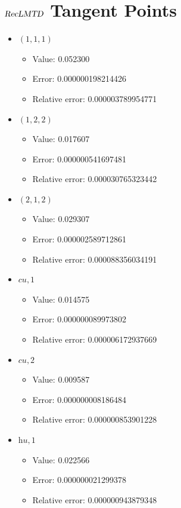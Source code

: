 \documentclass{article}%
\begin{document}
\section{$\textsl{RecLMTD}$ Tangent Points}%
\thispagestyle{plain}%
\begin{itemize}%
	\item $(1, 1, 1)$%
	\begin{itemize}%
		\item Value: 0.052300%
		\item Error: 0.000000198214426%
		\item Relative error: 0.000003789954771%
	\end{itemize}%
	\item $(1, 2, 2)$%
	\begin{itemize}%
		\item Value: 0.017607%
		\item Error: 0.000000541697481%
		\item Relative error: 0.000030765323442%
	\end{itemize}%
	\item $(2, 1, 2)$%
	\begin{itemize}%
		\item Value: 0.029307%
		\item Error: 0.000002589712861%
		\item Relative error: 0.000088356034191%
	\end{itemize}%
	\item $\textit{cu},1$%
	\begin{itemize}%
		\item Value: 0.014575%
		\item Error: 0.000000089973802%
		\item Relative error: 0.000006172937669%
	\end{itemize}%
	\item $\textit{cu},2$%
	\begin{itemize}%
		\item Value: 0.009587%
		\item Error: 0.000000008186484%
		\item Relative error: 0.000000853901228%
	\end{itemize}%
	\item $\textit{hu},1$%
	\begin{itemize}%
		\item Value: 0.022566%
		\item Error: 0.000000021299378%
		\item Relative error: 0.000000943879348%
	\end{itemize}%
\end{itemize}%
\end{document}
